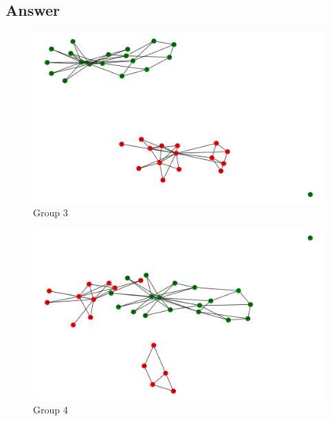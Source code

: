 \documentclass[12pt]{article}
\begin{document}
\subsection*{Answer}
\clearpage
\begin{figure}[h]
    \centering
    \includegraphics[trim=8 0 8 8, clip, width=160mm] {14y.PNG}
    \caption{Group 3}
    \label{fig:web-growth}
\end{figure}
\clearpage
\begin{figure}[h]
    \centering
    \includegraphics[trim=8 0 8 8, clip, width=170mm] {18y.PNG}
    \caption{Group 4}
    \label{fig:web-growth}
\end{figure}
\clearpage
\end{document}
